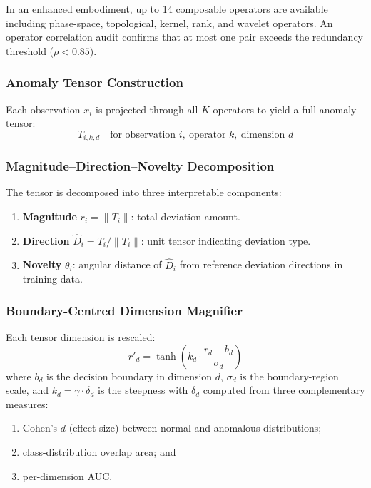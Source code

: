 \documentclass[12pt,a4paper]{article}
\begin{document}
In an enhanced embodiment, up to 14 composable operators are available
including phase-space, topological, kernel, rank, and wavelet operators.
An operator correlation audit confirms that at most one pair exceeds the
redundancy threshold ($\rho<0.85$).

\subsubsection{Anomaly Tensor Construction}

Each observation $x_i$ is projected through all $K$ operators to yield
a full anomaly tensor:
\begin{equation}
T_{i,k,d} \quad\text{for observation }i,\ \text{operator }k,
\ \text{dimension }d
\end{equation}

\subsubsection{Magnitude--Direction--Novelty Decomposition}

The tensor is decomposed into three interpretable components:
\begin{enumerate}[label=(\alph*)]
\item \textbf{Magnitude} $r_i = \|T_i\|$: total deviation amount.
\item \textbf{Direction} $\hat{D}_i = T_i/\|T_i\|$: unit tensor
indicating deviation type.
\item \textbf{Novelty} $\theta_i$: angular distance of $\hat{D}_i$ from
reference deviation directions in training data.
\end{enumerate}

\subsubsection{Boundary-Centred Dimension Magnifier}

Each tensor dimension is rescaled:
\begin{equation}
r'_d = \tanh\!\left(k_d\cdot\frac{r_d - b_d}{\sigma_d}\right)
\end{equation}
where $b_d$ is the decision boundary in dimension $d$, $\sigma_d$ is the
boundary-region scale, and $k_d = \gamma\cdot\delta_d$ is the steepness
with $\delta_d$ computed from three complementary measures:
\begin{enumerate}
\item Cohen's $d$ (effect size) between normal and anomalous distributions;
\item class-distribution overlap area; and
\item per-dimension AUC.
\end{enumerate}
\end{document}
